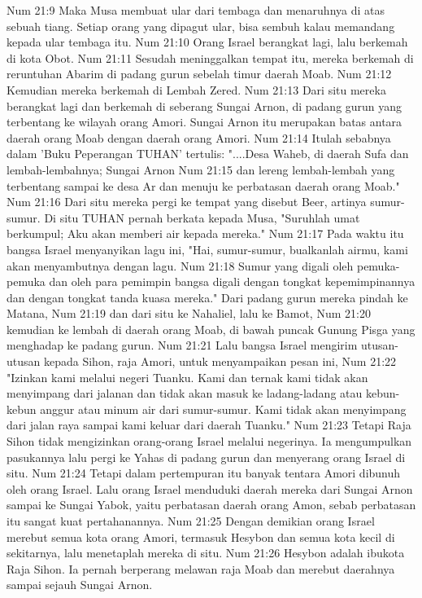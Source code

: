 Num 21:9  Maka Musa membuat ular dari tembaga dan menaruhnya di atas sebuah tiang. Setiap orang yang dipagut ular, bisa sembuh kalau memandang kepada ular tembaga itu.
Num 21:10  Orang Israel berangkat lagi, lalu berkemah di kota Obot.
Num 21:11  Sesudah meninggalkan tempat itu, mereka berkemah di reruntuhan Abarim di padang gurun sebelah timur daerah Moab.
Num 21:12  Kemudian mereka berkemah di Lembah Zered.
Num 21:13  Dari situ mereka berangkat lagi dan berkemah di seberang Sungai Arnon, di padang gurun yang terbentang ke wilayah orang Amori. Sungai Arnon itu merupakan batas antara daerah orang Moab dengan daerah orang Amori.
Num 21:14  Itulah sebabnya dalam 'Buku Peperangan TUHAN' tertulis: "....Desa Waheb, di daerah Sufa dan lembah-lembahnya; Sungai Arnon
Num 21:15  dan lereng lembah-lembah yang terbentang sampai ke desa Ar dan menuju ke perbatasan daerah orang Moab."
Num 21:16  Dari situ mereka pergi ke tempat yang disebut Beer, artinya sumur-sumur. Di situ TUHAN pernah berkata kepada Musa, "Suruhlah umat berkumpul; Aku akan memberi air kepada mereka."
Num 21:17  Pada waktu itu bangsa Israel menyanyikan lagu ini, "Hai, sumur-sumur, bualkanlah airmu, kami akan menyambutnya dengan lagu.
Num 21:18  Sumur yang digali oleh pemuka-pemuka dan oleh para pemimpin bangsa digali dengan tongkat kepemimpinannya dan dengan tongkat tanda kuasa mereka." Dari padang gurun mereka pindah ke Matana,
Num 21:19  dan dari situ ke Nahaliel, lalu ke Bamot,
Num 21:20  kemudian ke lembah di daerah orang Moab, di bawah puncak Gunung Pisga yang menghadap ke padang gurun.
Num 21:21  Lalu bangsa Israel mengirim utusan-utusan kepada Sihon, raja Amori, untuk menyampaikan pesan ini,
Num 21:22  "Izinkan kami melalui negeri Tuanku. Kami dan ternak kami tidak akan menyimpang dari jalanan dan tidak akan masuk ke ladang-ladang atau kebun-kebun anggur atau minum air dari sumur-sumur. Kami tidak akan menyimpang dari jalan raya sampai kami keluar dari daerah Tuanku."
Num 21:23  Tetapi Raja Sihon tidak mengizinkan orang-orang Israel melalui negerinya. Ia mengumpulkan pasukannya lalu pergi ke Yahas di padang gurun dan menyerang orang Israel di situ.
Num 21:24  Tetapi dalam pertempuran itu banyak tentara Amori dibunuh oleh orang Israel. Lalu orang Israel menduduki daerah mereka dari Sungai Arnon sampai ke Sungai Yabok, yaitu perbatasan daerah orang Amon, sebab perbatasan itu sangat kuat pertahanannya.
Num 21:25  Dengan demikian orang Israel merebut semua kota orang Amori, termasuk Hesybon dan semua kota kecil di sekitarnya, lalu menetaplah mereka di situ.
Num 21:26  Hesybon adalah ibukota Raja Sihon. Ia pernah berperang melawan raja Moab dan merebut daerahnya sampai sejauh Sungai Arnon.
